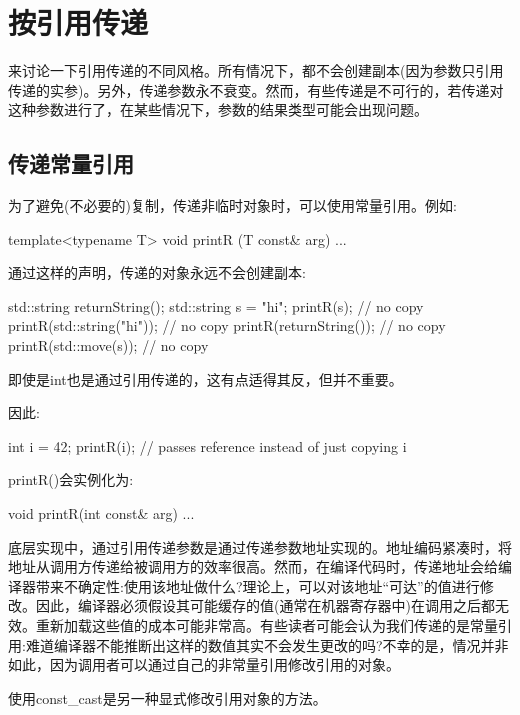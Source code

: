 \section{按引用传递}

来讨论一下引用传递的不同风格。所有情况下，都不会创建副本(因为参数只引用传递的实参)。另外，传递参数永不衰变。然而，有些传递是不可行的，若传递对这种参数进行了，在某些情况下，参数的结果类型可能会出现问题。

\subsection{传递常量引用}

为了避免(不必要的)复制，传递非临时对象时，可以使用常量引用。例如:

\begin{cpp}
template<typename T>
void printR (T const& arg) {
	...
}
\end{cpp}

通过这样的声明，传递的对象永远不会创建副本:

\begin{cpp}
std::string returnString();
std::string s = "hi";
printR(s); // no copy
printR(std::string("hi")); // no copy
printR(returnString()); // no copy
printR(std::move(s)); // no copy
\end{cpp}

即使是int也是通过引用传递的，这有点适得其反，但并不重要。

因此:

\begin{cpp}
int i = 42;
printR(i); // passes reference instead of just copying i
\end{cpp}

printR()会实例化为:

\begin{cpp}
void printR(int const& arg) {
	...
}
\end{cpp}

底层实现中，通过引用传递参数是通过传递参数地址实现的。地址编码紧凑时，将地址从调用方传递给被调用方的效率很高。然而，在编译代码时，传递地址会给编译器带来不确定性:使用该地址做什么?理论上，可以对该地址“可达”的值进行修改。因此，编译器必须假设其可能缓存的值(通常在机器寄存器中)在调用之后都无效。重新加载这些值的成本可能非常高。有些读者可能会认为我们传递的是常量引用:难道编译器不能推断出这样的数值其实不会发生更改的吗?不幸的是，情况并非如此，因为调用者可以通过自己的非常量引用修改引用的对象。

\begin{notice}
使用const\_cast是另一种显式修改引用对象的方法。
\end{notice}

